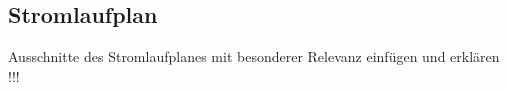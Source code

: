 \documentclass[../../../Bachelorarbeit.tex]{subfiles}
\begin{document}
\subsection{Stromlaufplan} \label{Stromlaufplan}
\color{red}
Ausschnitte des Stromlaufplanes mit besonderer Relevanz einfügen und erklären !!!
\end{document}
